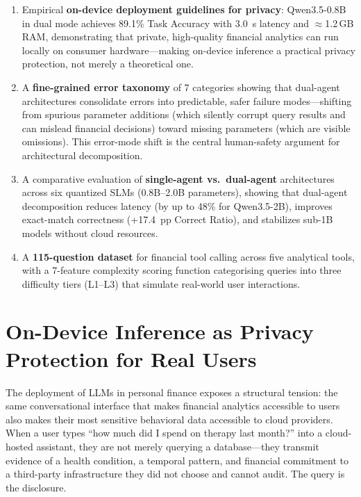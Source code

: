 \documentclass[11pt,twocolumn]{article}
\begin{document}
\begin{enumerate}
    \item Empirical \textbf{on-device deployment guidelines for
          privacy}: Qwen3.5-0.8B in dual mode achieves 89.1\% Task
          Accuracy with 3.0~s latency and $\approx$1.2\,GB RAM,
          demonstrating that private, high-quality financial analytics
          can run locally on consumer hardware---making on-device
          inference a practical privacy protection, not merely a
          theoretical one.

    \item A \textbf{fine-grained error taxonomy} of 7 categories
          showing that dual-agent architectures consolidate errors into
          predictable, safer failure modes---shifting from spurious
          parameter additions (which silently corrupt query results and
          can mislead financial decisions) toward missing parameters
          (which are visible omissions). This error-mode shift is the
          central human-safety argument for architectural decomposition.

    \item A comparative evaluation of \textbf{single-agent
          vs.\ dual-agent} architectures across six quantized SLMs
          (0.8B--2.0B parameters), showing that dual-agent
          decomposition reduces latency (by up to 48\% for
          Qwen3.5-2B), improves exact-match correctness (+17.4~pp
          Correct Ratio), and stabilizes sub-1B models without
          cloud resources.

    \item A \textbf{115-question dataset} for financial tool calling
          across five analytical tools, with a 7-feature complexity
          scoring function categorising queries into three difficulty
          tiers (L1--L3) that simulate real-world user interactions.
\end{enumerate}

\section{On-Device Inference as Privacy Protection for Real Users}
\label{sec:privacy}

The deployment of LLMs in personal finance exposes a structural
tension: the same conversational interface that makes financial
analytics accessible to users also makes their most sensitive
behavioral data accessible to cloud providers.
When a user types ``how much did I spend on therapy last month?'' into
a cloud-hosted assistant, they are not merely querying a
database---they transmit evidence of a health condition, a temporal 
pattern, and financial commitment to a third-party infrastructure 
they did not choose and cannot audit. The query is the disclosure.
\end{document}
